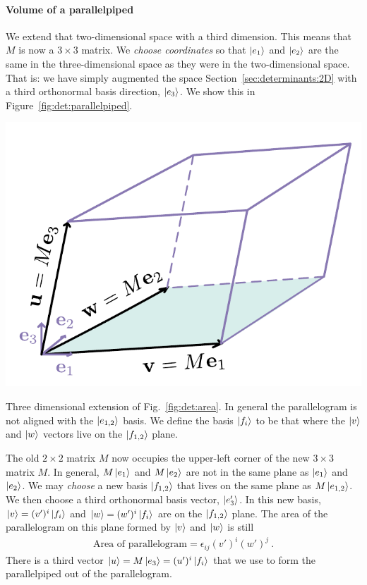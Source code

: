 \documentclass[12pt, oneside]{report}    %
\begin{document}
\paragraph{Volume of a parallelpiped}
We extend that two-dimensional space with a third dimension. This means that $M$ is now a $3\times 3$ matrix. We \emph{choose coordinates} so that $\left|e_1\right\rangle$ and $\left|e_2\right\rangle$ are the same in the three-dimensional space as they were in the two-dimensional space. That is: we have simply augmented the space Section~\ref{sec:determinants:2D} with a third orthonormal basis direction, $\left|e_3\right\rangle$. We show this in Figure~\ref{fig:det:parallelpiped}. 
\begin{marginfigure}%
    \includegraphics[width=\textwidth]{figures/det Parallelpiped.pdf}
    \caption{Three dimensional extension of Fig.~\ref{fig:det:area}. In general the parallelogram is not aligned with the $\left|e_{1,2}\right\rangle$ basis. We define the basis $\left|f_i\right\rangle$ to be that where the $\left|v\right\rangle$ and $\left|w\right\rangle$ vectors live on the $\left|f_{1,2}\right\rangle$ plane.}
    \label{fig:det:parallelpiped}
\end{marginfigure}

The old $2\times 2$ matrix $M$ now occupies the upper-left corner of the new $3\times 3$ matrix $M$. In general, $M\left|e_1\right\rangle$  and $M\left|e_2\right\rangle$ are not in the same plane as $\left|e_{1}\right\rangle$ and $\left|e_2\right\rangle$. We may \emph{choose} a new basis $\left|f_{1,2}\right\rangle$ that lives on the same plane as $M\left|e_{1,2}\right\rangle$.  We then choose a third orthonormal basis vector, $\left|e'_3\right\rangle$. In this new basis, $\left|v\right\rangle = (v')^i\left|f_i\right\rangle$ and $\left|w\right\rangle=(w')^i\left|f_i\right\rangle$ are on the $\left|f_{1,2}\right\rangle$ plane. The area of the parallelogram on this plane formed by $\left|v\right\rangle$ and $\left|w\right\rangle$ is still
\begin{align}
    \text{Area of parallelogram} = \epsilon_{ij}(v')^i(w')^j \ .
\end{align}
There is a third vector $\left|u\right\rangle = M\left|e_3\right\rangle = (u')^i \left|f_i\right\rangle$ that we use to form the parallelpiped out of the parallelogram. 
\end{document}
